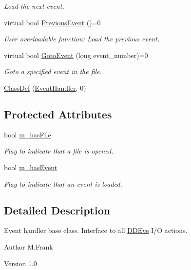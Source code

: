 \begin{DoxyCompactItemize}
\begin{DoxyCompactList}\small\item\em Load the next event. \item\end{DoxyCompactList}\item 
virtual bool \hyperlink{class_d_d4hep_1_1_event_handler_a0942608bebbdd107c9dedbdc7311791f}{PreviousEvent} ()=0
\begin{DoxyCompactList}\small\item\em User overloadable function: Load the previous event. \item\end{DoxyCompactList}\item 
virtual bool \hyperlink{class_d_d4hep_1_1_event_handler_a09c40b0b753455c1e3df7c561ff6b069}{GotoEvent} (long event\_\-number)=0
\begin{DoxyCompactList}\small\item\em Goto a specified event in the file. \item\end{DoxyCompactList}\item 
\hyperlink{class_d_d4hep_1_1_event_handler_a44c310a4296693f09e62adbac3fbe2c6}{ClassDef} (\hyperlink{class_d_d4hep_1_1_event_handler}{EventHandler}, 0)
\end{DoxyCompactItemize}
\subsection*{Protected Attributes}
\begin{DoxyCompactItemize}
\item 
bool \hyperlink{class_d_d4hep_1_1_event_handler_acfb701f8f671fe75df92d46d846613d5}{m\_\-hasFile}
\begin{DoxyCompactList}\small\item\em Flag to indicate that a file is opened. \item\end{DoxyCompactList}\item 
bool \hyperlink{class_d_d4hep_1_1_event_handler_adccb4980638cdc1ed7792ae8583f1370}{m\_\-hasEvent}
\begin{DoxyCompactList}\small\item\em Flag to indicate that an event is loaded. \item\end{DoxyCompactList}\end{DoxyCompactItemize}


\subsection{Detailed Description}
Event handler base class. Interface to all \hyperlink{struct_d_d4hep_1_1_d_d_eve}{DDEve} I/O actions. \begin{DoxyAuthor}{Author}
M.Frank 
\end{DoxyAuthor}
\begin{DoxyVersion}{Version}
1.0 
\end{DoxyVersion}


